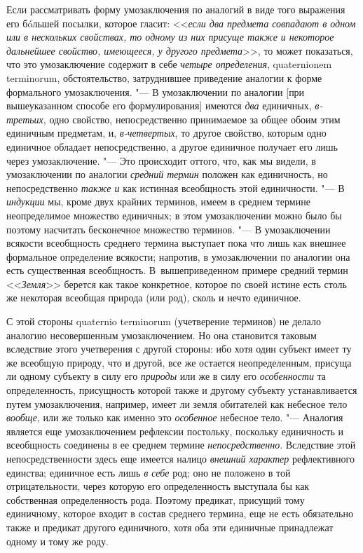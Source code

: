 Если рассматривать форму умозаключения по аналогий в виде того
выражения его бóльшей посылки, которое гласит:
<<{\em если два предмета совпадают в
одном или в нескольких свойствах, то одному из них присуще также и
некоторое дальнейшее свойство, имеющееся, у другого предмета}>>,
то может показаться, что это умозаключение содержит в себе
{\em четыре определения}, quaternionem
terminorum, обстоятельство, затруднившее приведение аналогии
к форме формального умозаключения. "--- В умозаключении по
аналогии [при вышеуказанном способе его формулирования] имеются
{\em два} единичных,
{\em в-третьих}, одно
свойство, непосредственно принимаемое за общее обоим этим единичным
предметам, и, {\em в-четвертых},
то другое свойство, которым одно единичное обладает
непосредственно, а другое единичное получает его лишь через умозаключение.
"--- Это происходит оттого, что, как мы видели, в умозаключении
по аналогии {\em средний термин}
положен как единичность, но непосредственно
{\em также и} как
истинная всеобщность этой единичности. "--- В
{\em индукции} мы, кроме
двух крайних терминов, имеем в среднем термине неопределимое множество
единичных; в этом умозаключении можно было бы поэтому насчитать бесконечное
множество терминов. "--- В умозаключении всякости всеобщность
среднего термина выступает пока что лишь как внешнее формальное определение
всякости; напротив, в умозаключении по аналогии она есть существенная
всеобщность. В~вышеприведенном примере средний термин
<<{\em Земля}>> берется как
такое конкретное, которое по своей истине есть столь же некоторая всеобщая
природа (или род), сколь и нечто единичное.

С этой стороны quaternio terminorum
(учетверение терминов) не делало аналогию несовершенным
умозаключением. Но она становится таковым вследствие этого учетверения с
другой стороны: ибо хотя один субъект имеет ту же всеобщую природу, что и
другой, все же остается неопределенным, присуща ли одному субъекту в силу
его {\em природы} или же
в силу его {\em особенности}
та определенность, присущность которой также и другому
субъекту устанавливается путем умозаключения, например, имеет ли земля
обитателей как небесное тело
{\em вообще}, или же
только как именно это {\em особенное}
небесное тело. "--- Аналогия является еще
умозаключением рефлексии постольку, поскольку единичность и всеобщность
соединены в ее среднем термине
{\em непосредственно}.
Вследствие этой непосредственности здесь еще имеется налицо
{\em внешний характер}
рефлективного единства; единичное есть лишь
{\em в себе} род; оно не
положено в той отрицательности, через которую его определенность выступала
бы как собственная определенность рода. Поэтому предикат, присущий тому
единичному, которое входит в состав среднего термина, еще не есть
обязательно также и предикат другого единичного, хотя оба эти единичные
принадлежат одному и тому же роду.

